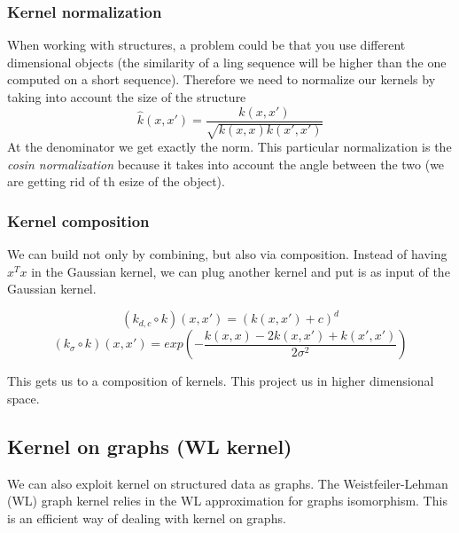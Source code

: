         \subsubsection{Kernel normalization}
            When working with structures, a problem could be that you use different dimensional objects (the similarity of a ling sequence will be higher than the one computed on a short sequence). 
            Therefore we need to normalize our kernels by taking into account the size of the structure
            $$\hat{k}(x,x') = \frac{k(x,x')}{\sqrt{k(x,x)k(x',x')}}$$
            At the denominator we get exactly the norm. 
            This particular normalization is the \textit{cosin normalization} because it takes into account the angle between the two (we are getting rid of th esize of the object). 

        \subsubsection{Kernel composition}
            We can build not only by combining, but also via composition. Instead of having $x^T x$ in the Gaussian kernel, we can plug another kernel and put is as input of the Gaussian kernel. 
            
    		$$(k_{d,c}\circ k)(x,x') = (k(x,x')+c)^d$$
    		$$(k_\sigma\circ k)(x,x') = exp\left({-\frac{k(x,x)-2k(x,x')+k(x',x')}{2\sigma^2}}\right)$$

            This gets us to a composition of kernels. This project us in higher dimensional space. 

    \subsection{Kernel on graphs (WL kernel)}
        We can also exploit kernel on structured data as graphs. The Weistfeiler-Lehman (WL) graph kernel relies in the WL approximation for graphs isomorphism. This is an efficient way of dealing with kernel on graphs.

